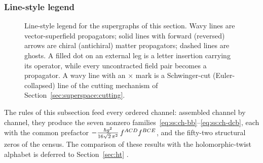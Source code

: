 \subsubsection*{Line-style legend}

\begin{figure}[t]
\centering
{}
\caption{Line-style legend for the supergraphs of this section. Wavy lines are vector-superfield propagators; solid lines with forward (reversed) arrows are chiral (antichiral) matter propagators; dashed lines are ghosts. A filled dot on an external leg is a letter insertion carrying its operator, while every uncontracted field pair becomes a propagator. A wavy line with an $\times$ mark is a Schwinger-cut (Euler-collapsed) line of the cutting mechanism of Section~\ref{sec:superspace:cutting}.}
\label{fig:ss:legend}
\end{figure}

The rules of this subsection feed every ordered channel: assembled channel by channel, they produce the seven nonzero families~\eqref{eq:ss:ch-bb}--\eqref{eq:ss:ch-dcb}, each with the common prefactor $-\frac{\hbar g^{2}}{16\sqrt2\,\pi^{2}}\,f^{ACD}f^{BCE}$, and the fifty-two structural zeros of the census. The comparison of these results with the holomorphic-twist alphabet is deferred to Section~\ref{sec:ht} \cite{BK}.
